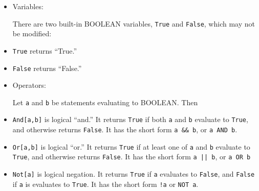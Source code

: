\begin{itemize}
\item
Variables:

There are two built-in BOOLEAN variables, \verb+True+  and \verb+False+, which
may not be modified: 

\bd
\item
\verb+True+ returns ``True.''

\item
\verb+False+ returns ``False.''
\ed

\item
Operators:

Let \verb+a+ and \verb+b+ be statements evaluating to BOOLEAN. Then  

\bd
\item
\verb+And[a,b]+ is logical ``and.''  It returns \verb+True+ if
both \verb+a+ and \verb+b+ evaluate to \verb+True+, and otherwise
returns \verb+False+.  It has the short form \verb+a && b+, or
\verb+a AND b+. 

\item
\verb+Or[a,b]+ is logical ``or.''  It returns \verb+True+ if
at least one of \verb+a+ and \verb+b+ evaluate to \verb+True+, and otherwise
returns \verb+False+. It has the short form \verb+a || b+, 
or \verb+a OR b+

\item
\verb+Not[a]+ is logical negation.  It returns \verb+True+ if \verb+a+
evaluates to \verb+False+, and \verb+False+ if \verb+a+ is evaluates
to \verb+True+.  It has the short form \verb+!a+ or \verb+NOT a+.
\ed 
\end{itemize}


